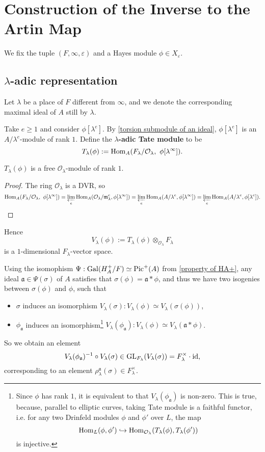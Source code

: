 \documentclass{article}
\renewcommand{\O}{\mathcal{O}}
\newcommand{\m}{\mathfrak{m}}
\DeclareMathOperator{\pic}{Pic}
\begin{document}
\section{Construction of the Inverse to the Artin Map}
We fix the tuple $(F, \infty, \varepsilon)$
and a Hayes module $\phi\in X_\varepsilon$.

\subsection{\texorpdfstring{$\lambda$}{lambda}-adic representation}
Let $\lambda$ be a place of $F$ different from $\infty$, and we denote the corresponding maximal ideal of $A$ still by $\lambda$.

Take $e\ge 1$ and consider $\phi[\lambda^e]$.
By \cref{torsion submodule of an ideal},
$\phi[\lambda^e]$ is an $A/\lambda^e$-module of rank $1$.
Define the \textbf{$\lambda$-adic Tate module} to be\[T_\lambda(\phi) := \Hom_A(F_\lambda/\O_\lambda,\ \phi[\lambda^\infty]).\]
\begin{proposition}
    $T_\lambda(\phi)$ is a free $\O_\lambda$-module of rank $1$.
\end{proposition}
\begin{proof}
    The ring $\O_\lambda$ is a DVR, so
    \[
        \Hom_A(F_\lambda/\O_\lambda,\ \phi[\lambda^\infty])
        = \varprojlim_e \Hom_A(\O_\lambda/\m_\lambda^e, \phi[\lambda^\infty])
        = \varprojlim_e \Hom_A(A/\lambda^e, \phi[\lambda^\infty])
        = \varprojlim_e \Hom_A(A/\lambda^e, \phi[\lambda^e]).\qedhere
    \]
\end{proof}

Hence \[V_\lambda(\phi) := T_\lambda(\phi)\otimes_{\O_\lambda} F_\lambda\] is a $1$-dimensional $F_\lambda$-vector space.


Using the isomophism $\Psi : \gal(H_A^+/F)\simeq \pic^+(A)$ from \cref{property of HA+},
any ideal $\mathfrak{a}\in\Psi(\sigma)$ of $A$ satisfies that $\sigma(\phi) = \mathfrak{a}*\phi$,
and thus we have two isogenies between $\sigma(\phi)$ and $\phi$, such that
\begin{itemize}
    \item $\sigma$ induces an isomorphism $V_\lambda(\sigma) : V_\lambda(\phi)\simeq V_\lambda(\sigma(\phi))$,
    \item $\phi_\mathfrak{a}$ induces an isomorphism\footnote{
        Since $\phi$ has rank $1$, it is equivalent to that $V_\lambda(\phi_\mathfrak{a})$ is non-zero.
        This is true, because, parallel to elliptic curves, taking Tate module is a faithful functor, i.e. for any two Drinfeld modules $\phi$ and $\phi'$ over $L$, the map
        \[\Hom_{L}(\phi, \phi')\hookrightarrow \Hom_{\O_\lambda}(T_\lambda(\phi), T_\lambda(\phi'))\]
        is injective.
    } $V_\lambda(\phi_\mathfrak{a}) : V_\lambda(\phi)\simeq V_\lambda(\mathfrak{a}*\phi)$.
\end{itemize}
So we obtain an element \[V_\lambda(\phi_\mathfrak{a})^{-1}\circ V_\lambda(\sigma)\in\operatorname{GL}_{F_\lambda}(V_\lambda(\sigma)) = F_\lambda^\times\cdot\operatorname{id},\]
corresponding to an element $\rho_\lambda^\mathfrak{a}(\sigma)\in F_\lambda^\times$.
\end{document}
